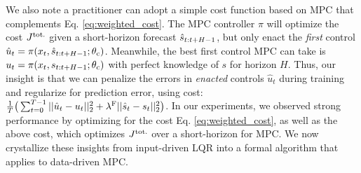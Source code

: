 We also note a practitioner can adopt a simple cost function based on MPC that complements Eq. \ref{eq:weighted_cost}. The MPC controller $\pi$ will optimize the cost $J^{\mathrm{tot.}}$ given a short-horizon forecast $\hat{s}_{t:t+H-1}$, but only enact the \textit{first} control $\hat{u}_t = \pi(x_t, \hat{s}_{t:t+H-1}; \theta_{\mathrm{c}})$. Meanwhile, the best first control MPC can take is $u_t = \pi(x_t, s_{t:t+H-1}; \theta_{\mathrm{c}})$ with perfect knowledge of $s$ for horizon $H$. Thus, our insight is that we can penalize the errors in \textit{enacted} controls $\hat{u}_t$ during training and regularize for prediction error, using cost:
$\frac{1}{T}\big(\sum_{t=0}^{T-1} \vert\vert \hat{u}_t - u_t \vert\vert_2^2 + \lambda^{\mathrm{F}} \vert\vert \hat{s}_{t} - s_t \vert\vert_2^2\big)$.
In our experiments, we observed strong performance by optimizing for the cost Eq. \ref{eq:weighted_cost}, as well as the above cost, which optimizes $J^{\mathrm{tot.}}$ over a short-horizon for MPC.
We now crystallize these insights from input-driven LQR into a formal algorithm that applies to data-driven MPC.
%
